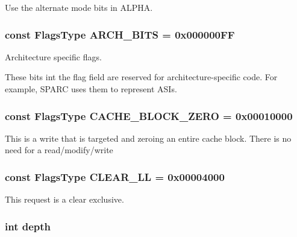 \label{classRequest_af5696d6c4c536a1c16a3fce36b9741c4}
Use the alternate mode bits in ALPHA. \hypertarget{classRequest_aaf4396fbbe70e17e09471bbcf9978a93}{
\subsubsection[{ARCH\_\-BITS}]{\setlength{\rightskip}{0pt plus 5cm}const {\bf FlagsType} {\bf ARCH\_\-BITS} = 0x000000FF}}
\label{classRequest_aaf4396fbbe70e17e09471bbcf9978a93}
Architecture specific flags.

These bits int the flag field are reserved for architecture-\/specific code. For example, SPARC uses them to represent ASIs. \hypertarget{classRequest_a4c22f8a3275a06b136b28f633beeee03}{
\subsubsection[{CACHE\_\-BLOCK\_\-ZERO}]{\setlength{\rightskip}{0pt plus 5cm}const {\bf FlagsType} {\bf CACHE\_\-BLOCK\_\-ZERO} = 0x00010000}}
\label{classRequest_a4c22f8a3275a06b136b28f633beeee03}
This is a write that is targeted and zeroing an entire cache block. There is no need for a read/modify/write \hypertarget{classRequest_ad3bec0fb1cf156170b4f9b3df49b22a6}{
\subsubsection[{CLEAR\_\-LL}]{\setlength{\rightskip}{0pt plus 5cm}const {\bf FlagsType} {\bf CLEAR\_\-LL} = 0x00004000}}
\label{classRequest_ad3bec0fb1cf156170b4f9b3df49b22a6}
This request is a clear exclusive. \hypertarget{classRequest_acb5ba97551079e0b072c62c21d784ac5}{
\subsubsection[{depth}]{\setlength{\rightskip}{0pt plus 5cm}int {\bf depth}}}
